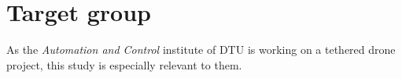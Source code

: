 %
%

\section*{Target group}
As the \emph{Automation and Control} institute of DTU is working on a tethered drone project, this study is especially relevant to them.